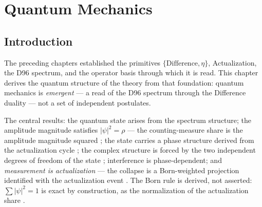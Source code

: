 %
%


\chapter{Quantum Mechanics}
\label{c09:chap:qm}

\section{Introduction}
\label{c09:sec:qm-introduction}

The preceding chapters established the primitives $\{\text{Difference},\eta\}$,
Actualization, the D96 spectrum, and the operator basis through which it is read. This
chapter derives the quantum structure of the theory from that foundation: quantum
mechanics is \emph{emergent} --- a read of the D96 spectrum through the Difference duality
--- not a set of independent postulates.

The central results: the quantum state arises from the spectrum structure; the amplitude
magnitude satisfies $|\psi|^2 = \rho$ --- the counting-measure share is the amplitude
magnitude squared \cite{c09:QG216}; the state carries a phase structure derived from the
actualization cycle \cite{c09:QG220}; the complex structure is forced by the two independent
degrees of freedom of the state \cite{c09:QG218}; interference is phase-dependent; and
\emph{measurement is actualization} --- the collapse is a Born-weighted projection identified
with the actualization event \cite{c09:QG223}. The Born rule is derived, not asserted:
$\sum|\psi|^2 = 1$ is exact by construction, as the normalization of the actualization share
\cite{c09:QG216}.

